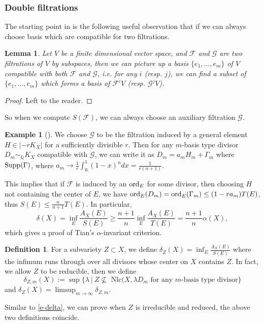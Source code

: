\documentclass[12pt,reqno]{amsart}%
\newcommand{\cF}{\mathcal{F}}
\newcommand{\ord}{{\rm ord}}
\newtheorem{lem}[thm]{Lemma}
\theoremstyle{definition}
\newtheorem{defn}[thm]{Definition}
\newtheorem{exmp}[thm]{Example}
\theoremstyle{remark}
\newcommand{\cG}{{\mathcal{G}}}
\begin{document}
\subsubsection{Double filtrations}

The starting point in \cite{AZ20} is the following useful observation that if we can always choose basis which are compatible for two filtrations.  
\begin{lem}\label{l-doublefil}
Let $V$ be a finite dimensional vector space, and $\cF$ and $\cG$ are two filtrations of $V$ by subspaces, then we can picture up a basis $\{e_1,...,e_m\}$ of $V$ compatible with both $\cF$ and $\cG$, i.e. for any $i$ (resp. $j$), we can find a subset of $\{e_1,...,e_m\}$  which forms a basis of $\cF^iV$ (resp. $\cG^j V$). 
\end{lem}
\begin{proof}Left to the reader. 
\end{proof}
So when we compute $S(\cF)$, we can always choose an auxiliary filtration $\cG$.
\begin{exmp}[{\cite[Lem. 4.2]{AZ20}}]\label{e-alpha}
We choose $\cG$ to be the filtration induced by a general element $H\in |-rK_X|$ for a sufficiently divisible $r$. Then for any $m$-basis type divisor $D_m\sim_{\mathbb Q}K_X$ compatible with $\cG$, we can write it as $D_m=a_mH_m+\Gamma_m$ where ${\rm Supp}(\Gamma)$, where $a_m\to \frac{1}{r}\int_0^{1}(1-x)^ndx=\frac{1}{r(n+1)}$. 

This implies that if $\cF$ is induced by an $\ord_E$ for some divisor, then choosing $H$ not containing the center of $E$, we have $\ord_{E}(D_m)=\ord_{E}(\Gamma_m)\le (1-ra_m)T(E)$, thus $S(E)\le \frac{n}{n+1}T(E)$. In particular, 
$$\delta(X)=\inf_E\frac{A_{X}(E)}{S(E)}\ge\frac{n+1}{n} \inf_E\frac{A_X(E)}{T(E)}=\frac{n+1}{n} \alpha(X),$$ 
which gives a proof of Tian's $\alpha$-invariant criterion.  
\end{exmp}

\begin{defn}For a subvariety $Z\subset X$, we define $\delta_Z(X)=\inf_E \frac{A_X(E)}{S(E)}$ where the infimum runs through over all divisors whose center on $X$ contains $Z$. In fact, we allow $Z$ to be reducible, then we define 
$$ \delta_{Z,m}(X):=\sup\{\lambda\ | \ Z\nsubseteq \mbox{ Nlc}(X,\lambda D_m \mbox{ for any $m$-basis type divisor}\} $$
and $\delta_{Z}(X)=\limsup_{m\to \infty}\delta_{Z,m}$.
\end{defn}
Similar to \eqref{e-delta}, we can prove when $Z$ is irreducible and reduced, the above two definitions coincide. 
\end{document}
